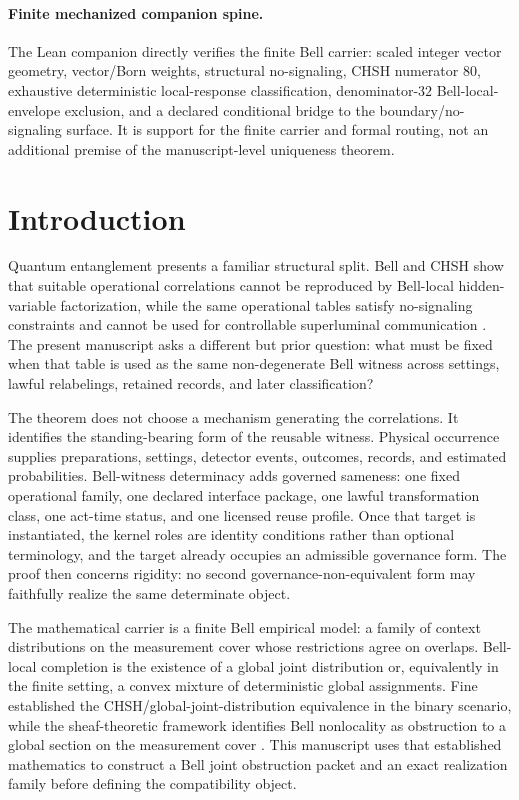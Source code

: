 \documentclass[11pt]{article}
\theoremstyle{definition}
\begin{document}
\paragraph{Finite mechanized companion spine.}
The Lean companion directly verifies the finite Bell carrier: scaled integer vector geometry, vector/Born weights, structural no-signaling, CHSH numerator $80$, exhaustive deterministic local-response classification, denominator-$32$ Bell-local-envelope exclusion, and a declared conditional bridge to the boundary/no-signaling surface. It is support for the finite carrier and formal routing, not an additional premise of the manuscript-level uniqueness theorem.

\tableofcontents

\section{Introduction}
Quantum entanglement presents a familiar structural split. Bell and CHSH show that suitable operational correlations cannot be reproduced by Bell-local hidden-variable factorization, while the same operational tables satisfy no-signaling constraints and cannot be used for controllable superluminal communication \cite{Bell1964,CHSH1969,Brunner2014}. The present manuscript asks a different but prior question: what must be fixed when that table is used as the same non-degenerate Bell witness across settings, lawful relabelings, retained records, and later classification?

The theorem does not choose a mechanism generating the correlations. It identifies the standing-bearing form of the reusable witness. Physical occurrence supplies preparations, settings, detector events, outcomes, records, and estimated probabilities. Bell-witness determinacy adds governed sameness: one fixed operational family, one declared interface package, one lawful transformation class, one act-time status, and one licensed reuse profile. Once that target is instantiated, the kernel roles are identity conditions rather than optional terminology, and the target already occupies an admissible governance form. The proof then concerns rigidity: no second governance-non-equivalent form may faithfully realize the same determinate object.

The mathematical carrier is a finite Bell empirical model: a family of context distributions on the measurement cover whose restrictions agree on overlaps. Bell-local completion is the existence of a global joint distribution or, equivalently in the finite setting, a convex mixture of deterministic global assignments. Fine established the CHSH/global-joint-distribution equivalence in the binary scenario, while the sheaf-theoretic framework identifies Bell nonlocality as obstruction to a global section on the measurement cover \cite{Fine1982,AbramskyBrandenburger2011}. This manuscript uses that established mathematics to construct a Bell joint obstruction packet and an exact realization family before defining the compatibility object.
\end{document}
